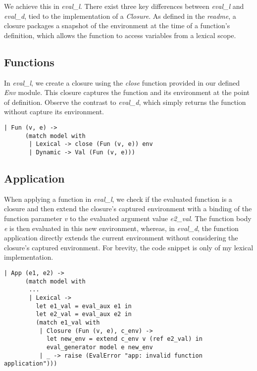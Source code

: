 \documentclass[12pt]{article}
\begin{document}
We achieve this in \textit{eval\_l}. There exist three key differences between \textit{eval\_l} and \textit{eval\_d}, tied to the implementation of a \textit{Closure}. As defined in the \textit{readme}, a closure packages a snapshot of the environment at the time of a function's definition, which allows the function to access variables from a lexical scope.

\subsection*{Functions}
In \textit{eval\_l}, we create a closure using the \textit{close} function provided in our defined \textit{Env} module. This closure captures the function and its environment at the point of definition. Observe the contrast to \textit{eval\_d}, which simply returns the function without capture its environment.

\begin{verbatim}
| Fun (v, e) ->
      (match model with
       | Lexical -> close (Fun (v, e)) env 
       | Dynamic -> Val (Fun (v, e))) 
\end{verbatim}

\subsection*{Application}
When applying a function in \textit{eval\_l}, we check if the evaluated function is a closure and then extend the closure's captured environment with a binding of the function parameter \textit{v} to the evaluated argument value \textit{e2\_val}. The function body \textit{e} is then evaluated in this new environment, whereas, in \textit{eval\_d}, the function application directly extends the current environment without considering the closure's captured environment. For brevity, the code snippet is only of my lexical implementation.

\begin{verbatim}
| App (e1, e2) ->
      (match model with
       ...
       | Lexical ->
         let e1_val = eval_aux e1 in
         let e2_val = eval_aux e2 in
         (match e1_val with
          | Closure (Fun (v, e), c_env) ->
            let new_env = extend c_env v (ref e2_val) in
            eval_generator model e new_env
          | _ -> raise (EvalError "app: invalid function application")))
\end{verbatim}
\end{document}
